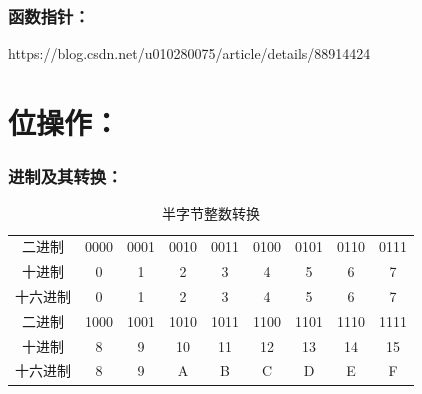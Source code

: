 \documentclass[zihao=-4,UTF8]{report}
\begin{document}
\subsubsection{函数指针：}
https://blog.csdn.net/u010280075/article/details/88914424

\section{位操作：}
\subsubsection{进制及其转换：}
\begin{table}[H]
    \centering
    \caption{半字节整数转换}
    \begin{tabular}{ccccccccc}
    \toprule
    二进制 & 0000 & 0001 & 0010 & 0011 & 0100 & 0101 & 0110 & 0111\\
    十进制 & 0 & 1 & 2 & 3 & 4 & 5 & 6 & 7\\
    十六进制 & 0 & 1 & 2 & 3 & 4 & 5 & 6 & 7\\
    \hline
    二进制& 1000 & 1001 & 1010 & 1011 & 1100 & 1101 & 1110 & 1111\\
    十进制& 8 & 9 & 10 & 11 & 12 & 13 & 14 & 15\\
    十六进制& 8 & 9 & A & B & C & D & E & F\\
    \bottomrule
    \end{tabular}
    \end{table}
\newpage
\nocite{*}



\newpage
\appendix
{}
\titleformat{\subsection}{\normalsize\bfseries}{\thesubsection}{1em}{}
\end{document}
